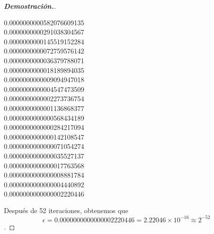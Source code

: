 \documentclass{article}
\begin{document}
\begin{enumerate}
\begin{mdframed}[
			      linecolor=darkgray,
			      backgroundcolor=white]
\begin{proof}[\textbf{Demostraci\'on.}]
\begin{center}
				      0.0000000000582076609135\\
				      0.0000000000291038304567\\
				      0.0000000000145519152284\\
				      0.0000000000072759576142\\
				      0.0000000000036379788071\\
				      0.0000000000018189894035\\
				      0.0000000000009094947018\\
				      0.0000000000004547473509\\
				      0.0000000000002273736754\\
				      0.0000000000001136868377\\
				      0.0000000000000568434189\\
				      0.0000000000000284217094\\
				      0.0000000000000142108547\\
				      0.0000000000000071054274\\
				      0.0000000000000035527137\\
				      0.0000000000000017763568\\
				      0.0000000000000008881784\\
				      0.0000000000000004440892\\
				      0.0000000000000002220446\\

			      \end{center}

			      Despu\'es de 52 iteraciones, obtenemos que $$\epsilon = 0.0000000000000002220446 = 2.22046\times10^{-16} \approx 2^{-52}$$.
			      
		      \end{proof}
	      \end{mdframed}

\end{enumerate}
	
\end{document}
